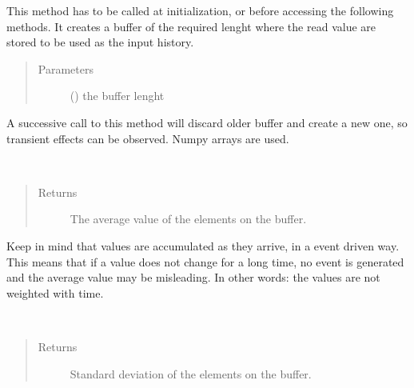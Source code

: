 \documentclass[letterpaper,10pt,english]{sphinxmanual}
\begin{document}
\begin{fulllineitems}
\label{\detokenize{io:setBufSize}}
This method has to be called at initialization, or before accessing the
following methods. It creates a buffer of the required lenght where the read
value are stored to be used as the input history.
\begin{quote}\begin{description}
\item[{Parameters}] \leavevmode
{} () \textendash{} the buffer lenght

\end{description}\end{quote}

A successive call to this method will discard older buffer and create a new
one, so transient effects can be observed. Numpy arrays are used.

\end{fulllineitems}


\begin{fulllineitems}
\label{\detokenize{io:valAvg}}~\begin{quote}\begin{description}
\item[{Returns}] \leavevmode
The average value of the elements on the buffer.

\end{description}\end{quote}

Keep in mind that values are accumulated as they arrive, in a event driven
way. This means that if a value does not change for a long time, no event is
generated and the average value may be misleading. In other words: the
values are not weighted with time.

\end{fulllineitems}


\begin{fulllineitems}
\label{\detokenize{io:valStd}}~\begin{quote}\begin{description}
\item[{Returns}] \leavevmode
Standard deviation of the elements on the buffer.

\end{description}\end{quote}

\end{fulllineitems}
\end{document}
